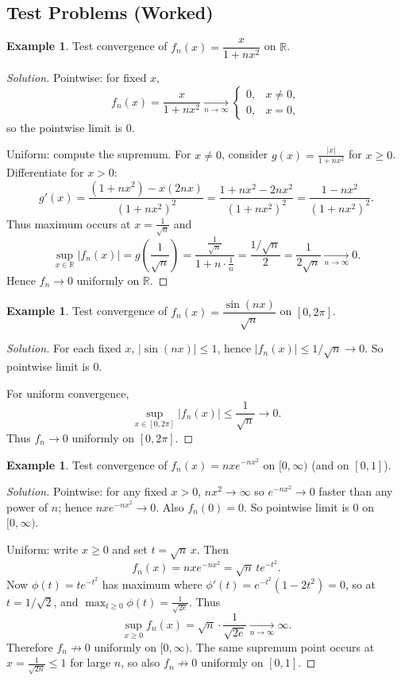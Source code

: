 \documentclass[12pt]{article}
\theoremstyle{definition}
\newtheorem{example}[theorem]{Example}
\begin{document}
\subsection{Test Problems (Worked)}

\begin{example}
Test convergence of $f_n(x)=\dfrac{x}{1+n x^2}$ on $\mathbb{R}$.
\end{example}

\begin{proof}[Solution]
Pointwise: for fixed $x$,
\[
f_n(x)=\frac{x}{1+n x^2}\xrightarrow[n\to\infty]{}
\begin{cases}
0,& x\neq 0,\\
0,& x=0,
\end{cases}
\]
so the pointwise limit is $0$.

Uniform: compute the supremum. For $x\neq 0$, consider $g(x)=\frac{|x|}{1+n x^2}$ for $x\ge 0$.
Differentiate for $x>0$:
\[
g'(x)=\frac{(1+n x^2)-x(2n x)}{(1+n x^2)^2}
=\frac{1+n x^2-2n x^2}{(1+n x^2)^2}
=\frac{1-n x^2}{(1+n x^2)^2}.
\]
Thus maximum occurs at $x=\frac{1}{\sqrt{n}}$ and
\[
\sup_{x\in\mathbb{R}}|f_n(x)|
= g\!\left(\frac{1}{\sqrt{n}}\right)
= \frac{\frac{1}{\sqrt{n}}}{1+n\cdot \frac{1}{n}}
= \frac{1/\sqrt{n}}{2}
= \frac{1}{2\sqrt{n}}
\xrightarrow[n\to\infty]{}0.
\]
Hence $f_n\to 0$ uniformly on $\mathbb{R}$.
\end{proof}

\begin{example}
Test convergence of $f_n(x)=\dfrac{\sin(nx)}{\sqrt{n}}$ on $[0,2\pi]$.
\end{example}

\begin{proof}[Solution]
For each fixed $x$, $|\sin(nx)|\le 1$, hence $|f_n(x)|\le 1/\sqrt{n}\to 0$.
So pointwise limit is $0$.

For uniform convergence,
\[
\sup_{x\in[0,2\pi]}|f_n(x)|\le \frac{1}{\sqrt{n}}\to 0.
\]
Thus $f_n\to 0$ uniformly on $[0,2\pi]$.
\end{proof}

\begin{example}
Test convergence of $f_n(x)=n x e^{-n x^2}$ on $[0,\infty)$ (and on $[0,1]$).
\end{example}

\begin{proof}[Solution]
Pointwise: for any fixed $x>0$, $n x^2\to\infty$ so $e^{-n x^2}\to 0$ faster than any power of $n$;
hence $n x e^{-n x^2}\to 0$. Also $f_n(0)=0$. So pointwise limit is $0$ on $[0,\infty)$.

Uniform: write $x\ge 0$ and set $t=\sqrt{n}\,x$. Then
\[
f_n(x)=n x e^{-n x^2} = \sqrt{n}\, t e^{-t^2}.
\]
Now $\phi(t)=t e^{-t^2}$ has maximum where $\phi'(t)=e^{-t^2}(1-2t^2)=0$,
so at $t=1/\sqrt{2}$, and $\max_{t\ge 0}\phi(t)=\frac{1}{\sqrt{2e}}$.
Thus
\[
\sup_{x\ge 0} f_n(x)=\sqrt{n}\cdot \frac{1}{\sqrt{2e}} \xrightarrow[n\to\infty]{}\infty.
\]
Therefore $f_n\not\to 0$ uniformly on $[0,\infty)$.
The same supremum point occurs at $x=\frac{1}{\sqrt{2n}}\le 1$ for large $n$,
so also $f_n\not\to 0$ uniformly on $[0,1]$.
\end{proof}
\end{document}
